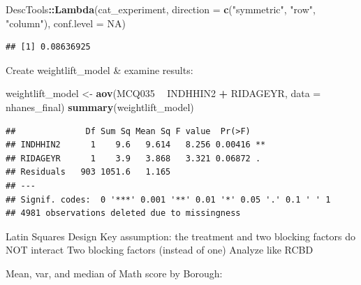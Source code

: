 \documentclass[]{book}
\newenvironment{Shaded}{\begin{snugshade}}{\end{snugshade}}
\newcommand{\DataTypeTok}[1]{\textcolor[rgb]{0.13,0.29,0.53}{#1}}
\newcommand{\DecValTok}[1]{\textcolor[rgb]{0.00,0.00,0.81}{#1}}
\newcommand{\KeywordTok}[1]{\textcolor[rgb]{0.13,0.29,0.53}{\textbf{#1}}}
\newcommand{\NormalTok}[1]{#1}
\newcommand{\OperatorTok}[1]{\textcolor[rgb]{0.81,0.36,0.00}{\textbf{#1}}}
\newcommand{\OtherTok}[1]{\textcolor[rgb]{0.56,0.35,0.01}{#1}}
\newcommand{\StringTok}[1]{\textcolor[rgb]{0.31,0.60,0.02}{#1}}
\begin{document}
\begin{Shaded}
\begin{Highlighting}[]
\NormalTok{DescTools}\OperatorTok{::}\KeywordTok{Lambda}\NormalTok{(cat_experiment, }\DataTypeTok{direction =} \KeywordTok{c}\NormalTok{(}\StringTok{"symmetric"}\NormalTok{, }\StringTok{"row"}\NormalTok{, }\StringTok{"column"}\NormalTok{), }\DataTypeTok{conf.level =} \OtherTok{NA}\NormalTok{)}
\end{Highlighting}
\end{Shaded}

\begin{verbatim}
## [1] 0.08636925
\end{verbatim}

Create weightlift\_model \& examine results:

\begin{Shaded}
\begin{Highlighting}[]
\NormalTok{weightlift_model <-}\StringTok{ }\KeywordTok{aov}\NormalTok{(MCQ035 }\OperatorTok{~}\StringTok{ }\NormalTok{INDHHIN2 }\OperatorTok{+}\StringTok{ }\NormalTok{RIDAGEYR, }\DataTypeTok{data =}\NormalTok{ nhanes_final)}
\KeywordTok{summary}\NormalTok{(weightlift_model)}
\end{Highlighting}
\end{Shaded}

\begin{verbatim}
##              Df Sum Sq Mean Sq F value  Pr(>F)   
## INDHHIN2      1    9.6   9.614   8.256 0.00416 **
## RIDAGEYR      1    3.9   3.868   3.321 0.06872 . 
## Residuals   903 1051.6   1.165                   
## ---
## Signif. codes:  0 '***' 0.001 '**' 0.01 '*' 0.05 '.' 0.1 ' ' 1
## 4981 observations deleted due to missingness
\end{verbatim}

Latin Squares Design
Key assumption: the treatment and two blocking factors do NOT interact
Two blocking factors (instead of one)
Analyze like RCBD

Mean, var, and median of Math score by Borough:

\begin{Shaded}
\end{Shaded}
\end{document}
